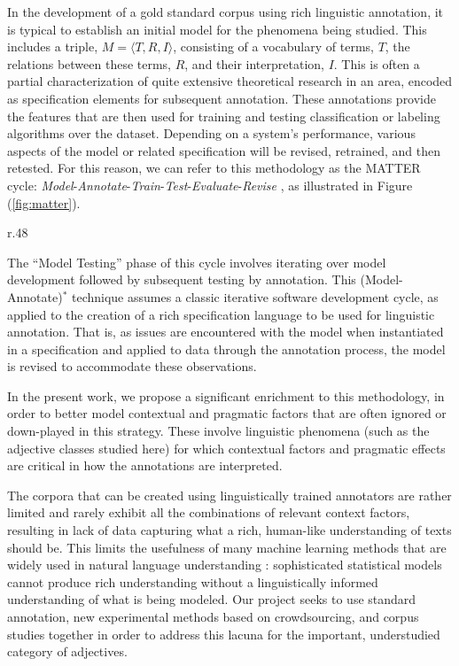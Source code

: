 \documentclass[10pt]{article}
\begin{document}
In the development of a gold standard corpus using rich linguistic annotation, it is typical to establish an initial model for the phenomena being studied. This includes a triple, $M = \langle T,R,I \rangle$, consisting of a
vocabulary of terms, $T$, the relations between these terms, $R$, and their interpretation,
$I$. This is often a partial  characterization of quite extensive theoretical research in an area, encoded as specification elements for subsequent annotation. These annotations provide the features that are then used for training and testing classification or labeling algorithms over the dataset. Depending on a system's performance, various aspects of the model or related specification will be revised, retrained, and then retested. 
For this reason, we can refer to this methodology as the MATTER cycle: {\it Model}-{\it Annotate}-{\it Train}-{\it Test}-{\it Evaluate}-{\it Revise}  \cite{pustejovsky2012natural}, as illustrated in Figure (\ref{fig:matter}). 

\begin{wrapfigure}{r}{.48\textwidth}
\vspace {-9mm}



  \centering
  \vspace {-4mm}
  \caption{The \textsc{matter} Methodology}
  \label{fig:matter}

  \vspace {-2mm}

\end{wrapfigure}

The ``Model Testing'' phase of this cycle involves iterating over model development followed by subsequent testing by annotation. This  (Model-Annotate)$^*$ technique assumes a classic iterative software development cycle, as applied to the creation of a rich specification language to be used for linguistic annotation.  That is, as issues are encountered
with the model when instantiated in a specification and applied to data
through the annotation process, the model is revised to accommodate
these observations. 

\medskip
In the present work, we propose a significant enrichment to this methodology, in order to better
model  contextual and pragmatic factors that are often ignored or down-played in this strategy. 
These involve linguistic phenomena (such as the adjective classes studied here) for which contextual factors and pragmatic effects are critical in how the annotations are interpreted.  

The corpora that can be created using linguistically trained annotators are rather limited and rarely exhibit all the combinations of  relevant context factors, resulting in lack of data capturing what a rich, human-like understanding of texts should be. This limits the usefulness of many machine learning methods that are widely used in natural language understanding \cite{manning1999foundations,wasserman2004all,murphy2012machine}: sophisticated statistical models cannot produce rich understanding without a linguistically informed understanding of what is being modeled. Our project seeks to use standard annotation, new experimental methods based on crowdsourcing, and corpus studies together in order to address this lacuna for the important, understudied category of adjectives.
\end{document}
